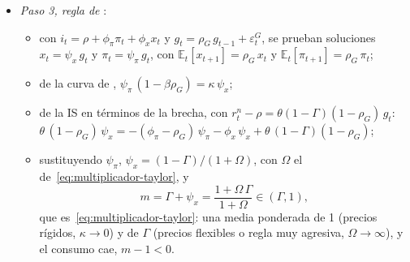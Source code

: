 \documentclass[11pt]{article}
\begin{document}
\begin{itemize}
\item \emph{Paso 3, regla de }:
  \begin{itemize}
  \item con $i_t=\rho+\phi_\pi\pi_t+\phi_x x_t$ y $g_t=\rho_G\,g_{t-1}+\varepsilon^G_t$, se prueban soluciones $x_t=\psi_x\,g_t$ y $\pi_t=\psi_\pi\,g_t$, con $\mathbb{E}_t[x_{t+1}]=\rho_G\,x_t$ y $\mathbb{E}_t[\pi_{t+1}]=\rho_G\,\pi_t$;
  \item de la curva de , $\psi_\pi\,(1-\beta\rho_G)=\kappa\,\psi_x$;
  \item de la IS en términos de la brecha, con $r^n_t-\rho=\theta(1-\Gamma)(1-\rho_G)\,g_t$: $\theta\,(1-\rho_G)\,\psi_x=-(\phi_\pi-\rho_G)\,\psi_\pi-\phi_x\,\psi_x+\theta\,(1-\Gamma)(1-\rho_G)$;
  \item sustituyendo $\psi_\pi$, $\psi_x=(1-\Gamma)/(1+\Omega)$, con $\Omega$ el de~\eqref{eq:multiplicador-taylor}, y
    \begin{equation}
    m=\Gamma+\psi_x=\frac{1+\Omega\,\Gamma}{1+\Omega}\in(\Gamma,1), \label{eq:anexo-taylor}
    \end{equation}
    que es~\eqref{eq:multiplicador-taylor}: una media ponderada de 1 (precios rígidos, $\kappa\to0$) y de $\Gamma$ (precios flexibles o regla muy agresiva, $\Omega\to\infty$), y el consumo cae, $m-1<0$\nocite{Woodford2011Simple}. \findemo
  \end{itemize}


\end{itemize}
\end{document}
